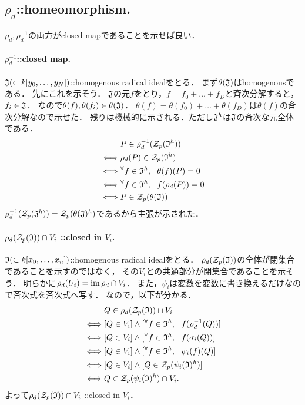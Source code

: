 \documentclass[a4paper]{jsarticle}
\begin{document}
    \subsection{$\rho_d$::homeomorphism.}
    $\rho_d, \rho_d^{-1}$の両方がclosed mapであることを示せば良い．

    \paragraph{$\rho_d^{-1}$::closed map.}
    $\mathfrak{J} (\subset k[y_0,\dots,y_N])$::homogenous radical idealをとる．
    まず$\theta(\mathfrak{J})$はhomogenousである．
    先にこれを示そう．
    $\mathfrak{J}$の元$f$をとり，$f=f_0+\dots+f_D$と斉次分解すると，$f_i \in \mathfrak{J}$．
    なので$\theta(f), \theta(f_i) \in \theta(\mathfrak{J})$．
    $\theta(f)=\theta(f_0)+\dots+\theta(f_D)$は$\theta(f)$の斉次分解なので示せた．
    残りは機械的に示される．ただし$\mathfrak{J}^h$は$\mathfrak{J}$の斉次な元全体である．
    \begin{align*}
        {}&     P \in \rho_d^{-1}(\mathcal{Z}_p(\mathfrak{I}^h)) \\
        \iff&   \rho_d(P) \in \mathcal{Z}_p(\mathfrak{I}^h) \\
        \iff&   {}^{\forall} f \in \mathfrak{I}^h,~~ \theta(f)(P)=0 \\
        \iff&   {}^{\forall} f \in \mathfrak{I}^h,~~ f(\rho_d(P))=0 \\
        \iff&   P \in \mathcal{Z}_p(\theta(\mathfrak{I}))
    \end{align*}
    $\rho_d^{-1}(\mathcal{Z}_p(\mathfrak{J}^h))=\mathcal{Z}_p(\theta(\mathfrak{J})^h)$であるから主張が示された．

    \paragraph{$\rho_d(\mathcal{Z}_p(\mathfrak{I})) \cap V_i$ ::closed in $V_i$.}
    $\mathfrak{I} (\subset k[x_0,\dots,x_n])$::homogenous radical idealをとる．
    $\rho_d(\mathcal{Z}_p(\mathfrak{I}))$の全体が閉集合であることを示すのではなく，
    その$V_i$との共通部分が閉集合であることを示そう．
    明らかに$\rho_d(U_i)=\operatorname{im} \rho_d \cap V_i$．
    また，$\psi_i$は変数を変数に書き換えるだけなので斉次式を斉次式へ写す．
    なので，以下が分かる．
    \begin{align*}
        {}&     Q \in \rho_d(\mathcal{Z}_p(\mathfrak{I})) \cap V_i \\
        \iff&   [Q \in V_i] \land [{}^{\forall} f \in \mathfrak{I}^h,~~ f(\rho_d^{-1}(Q))] \\
        \iff&   [Q \in V_i] \land [{}^{\forall} f \in \mathfrak{I}^h,~~ f(\sigma_i(Q))] \\
        \iff&   [Q \in V_i] \land [{}^{\forall} f \in \mathfrak{I}^h,~~ \psi_i(f)(Q)] \\
        \iff&   [Q \in V_i] \land [Q \in \mathcal{Z}_p(\psi_i(\mathfrak{I})^h)] \\
        \iff&   Q \in \mathcal{Z}_p(\psi_i(\mathfrak{I})^h) \cap V_i .
    \end{align*}
    よって$\rho_d(\mathcal{Z}_p(\mathfrak{I})) \cap V_i$ ::closed in $V_i$．
\end{document}
